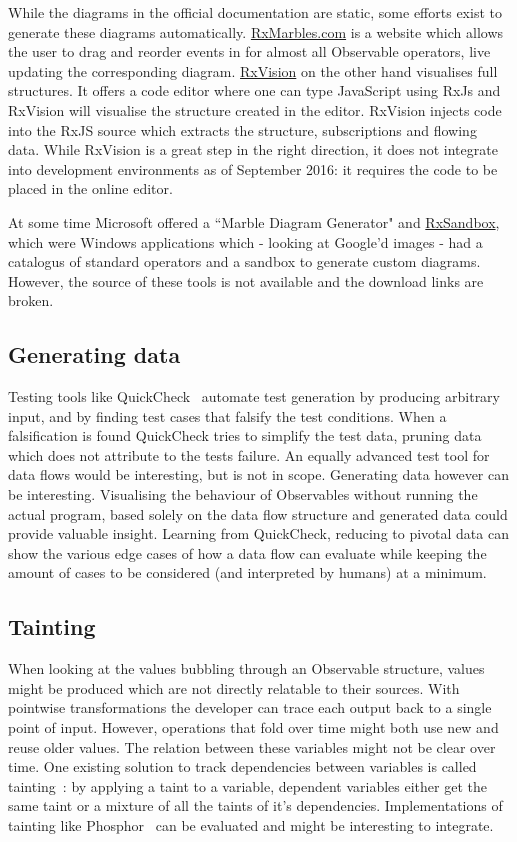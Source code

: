 \documentclass[11pt,a4paper]{article}
\begin{document}
While the diagrams in the official documentation are static, some
efforts exist to generate these diagrams automatically.  \href{http://RxMarbles.com}
{RxMarbles.com} is a website which allows the user to drag and reorder
events in for almost all Observable operators, live updating the
corresponding diagram.  \href{https://github.com/jaredly/rxvision}{RxVision}
on the other hand visualises full structures.  It offers a code editor
where one can type JavaScript using RxJs and RxVision will visualise the
structure created in the editor.  RxVision injects code into the RxJS
source which extracts the structure, subscriptions and flowing data.
While RxVision is a great step in the right direction, it does not
integrate into development environments as of September 2016:  it
requires the code to be placed in the online editor.

At some time Microsoft offered a ``Marble Diagram Generator" and \href{http://mnajder.blogspot.nl/2010/03/rxsandbox-v1.html}
{RxSandbox}, which were Windows applications which - looking at Google'd
images - had a catalogus of standard operators and a sandbox to generate
custom diagrams.  However, the source of these tools is not available
and the download links are broken.

\subsection{Generating data}%
\label{sec:gen-data} Testing tools like QuickCheck~\cite{quickcheck}
automate test generation by producing arbitrary input, and by finding
test cases that falsify the test conditions.  When a falsification is
found QuickCheck tries to simplify the test data, pruning data which
does not attribute to the tests failure.  An equally advanced test tool
for data flows would be interesting, but is not in scope.  Generating
data however can be interesting.  Visualising the behaviour of
Observables without running the actual program, based solely on the data
flow structure and generated data could provide valuable insight.
Learning from QuickCheck, reducing to pivotal data can show the various
edge cases of how a data flow can evaluate while keeping the amount of
cases to be considered (and interpreted by humans) at a minimum.

\subsection{Tainting} When looking at the values bubbling through an
Observable structure, values might be produced which are not directly
relatable to their sources.  With pointwise transformations the
developer can trace each output back to a single point of input.
However, operations that fold over time might both use new and reuse
older values.  The relation between these variables might not be clear
over time.  One existing solution to track dependencies between
variables is called tainting~\cite{bell2015dynamic}:  by applying a
taint to a variable, dependent variables either get the same taint or a
mixture of all the taints of it's dependencies.  Implementations of
tainting like Phosphor~\cite{bell2014phosphor} can be evaluated and
might be interesting to integrate.
\end{document}
